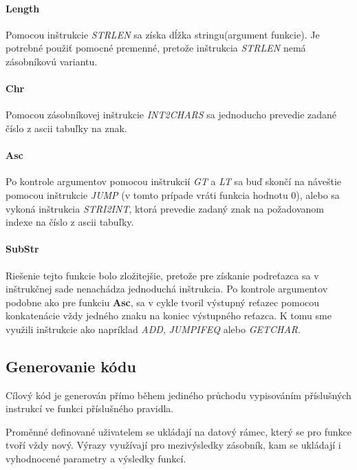 \documentclass{article}
\begin{document}
            \paragraph{Length}
            Pomocou inštrukcie \emph{STRLEN} sa získa dĺžka stringu(argument funkcie). Je potrebné použiť pomocné premenné, pretože 
            inštrukcia \emph{STRLEN} nemá zásobníkovú variantu.

            \paragraph{Chr}
            Pomocou zásobníkovej inštrukcie \emph{INT2CHARS} sa jednoducho prevedie zadané číslo z ascii tabuľky na znak.

            \paragraph{Asc}
            Po kontrole argumentov pomocou inštrukcií \emph{GT} a \emph{LT} sa buď skončí na náveštie pomocou inštrukcie 
            \emph{JUMP} (v tomto prípade vráti funkcia hodnotu 0), alebo sa vykoná inštrukcia \emph{STRI2INT},
            ktorá prevedie zadaný znak na požadovanom indexe na číslo z ascii tabuľky.

            \paragraph{SubStr}
            Riešenie tejto funkcie bolo zložitejšie, pretože pre získanie podreťazca sa v inštrukčnej sade nenachádza jednoduchá
            inštrukcia. Po kontrole argumentov podobne ako pre funkciu \textbf{Asc}, sa v cykle tvoril výstupný reťazec
            pomocou konkatenácie vždy jedného znaku na koniec výstupného reťazca. K tomu sme využili inštrukcie ako napríklad
            \emph{ADD}, \emph{JUMPIFEQ} alebo \emph{GETCHAR}.
            
        \subsection{Generovanie kódu}
            Cílový kód je generován přímo během jediného průchodu vypisováním příslušných instrukcí ve funkci
            příslušného pravidla.
            
            Proměnné definované uživatelem se ukládají na datový rámec, který se pro funkce
            tvoří vždy nový.
            Výrazy využívají pro mezivýsledky zásobník, kam se ukládají i vyhodnocené parametry a výsledky funkcí.
            
\end{document}

